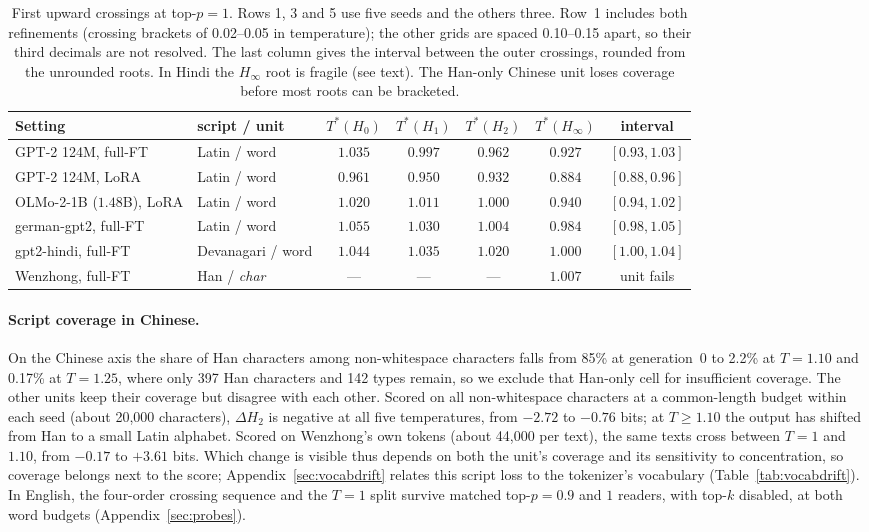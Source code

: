 \documentclass[10pt]{article}
\theoremstyle{plain}
\theoremstyle{definition}
\newcommand{\Htwo}{H_2}
\newcommand{\Hz}{H_0}
\newcommand{\Hinf}{H_\infty}
\begin{document}
\begin{table}[t]
\centering\small
\caption{First upward crossings at top-$p=1$. Rows 1, 3 and 5 use five seeds and the others
three. Row~1 includes both refinements (crossing brackets of 0.02--0.05 in temperature); the
other grids are spaced 0.10--0.15 apart, so their third decimals are not resolved. The last column gives the interval between the outer crossings, rounded from the unrounded roots. In Hindi the $\Hinf$ root is fragile (see
text). The Han-only Chinese unit loses coverage before
most roots can be bracketed.}
\label{tab:xsize}
\begin{tabular}{llccccc}
\toprule
Setting & script / unit & $T^\ast(\Hz)$ & $T^\ast(H_1)$ & $T^\ast(\Htwo)$ & $T^\ast(\Hinf)$ & interval \\
\midrule
GPT-2 124M, full-FT & Latin / word & $1.035$ & $0.997$ & $0.962$ & $0.927$ & $[0.93,1.03]$ \\
GPT-2 124M, LoRA & Latin / word & $0.961$ & $0.950$ & $0.932$ & $0.884$ & $[0.88,0.96]$ \\
OLMo-2-1B ($1.48$B), LoRA & Latin / word & $1.020$ & $1.011$ & $1.000$ & $0.940$ & $[0.94,1.02]$ \\
\midrule
german-gpt2, full-FT & Latin / word & $1.055$ & $1.030$ & $1.004$ & $0.984$ & $[0.98,1.05]$ \\
gpt2-hindi, full-FT & Devanagari / word & $1.044$ & $1.035$ & $1.020$ & $1.000$ & $[1.00,1.04]$ \\
Wenzhong, full-FT & Han / \emph{char} & --- & --- & --- & $1.007$ & unit fails \\
\bottomrule
\end{tabular}
\end{table}

\paragraph{Script coverage in Chinese.} On the Chinese axis the share of Han characters among
non-whitespace characters falls from 85\% at generation~0 to 2.2\% at $T=1.10$ and 0.17\% at
$T=1.25$, where only 397 Han characters and 142 types remain, so we exclude that Han-only cell
for insufficient coverage. The other units keep their coverage but disagree with each other.
Scored on all non-whitespace characters at a common-length budget within each seed (about 20,000
characters), $\Delta\Htwo$ is negative at all five temperatures, from $-2.72$ to $-0.76$ bits;
at $T\ge1.10$ the output has shifted from Han to a small Latin alphabet. Scored on Wenzhong's own
tokens (about 44,000 per text), the same texts cross between $T=1$ and $1.10$, from $-0.17$ to
$+3.61$ bits. Which change is visible thus depends on both the unit's coverage and its
sensitivity to concentration, so coverage belongs next to the score; Appendix~\ref{sec:vocabdrift} relates
this script loss to the tokenizer's vocabulary (Table~\ref{tab:vocabdrift}). In English, the
four-order crossing sequence and the $T=1$ split survive matched top-$p=0.9$ and $1$ readers,
with top-$k$ disabled, at both word budgets (Appendix~\ref{sec:probes}).
\end{document}
